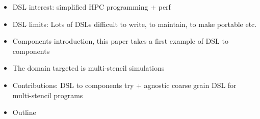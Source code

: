 \begin{itemize}
\item DSL interest: simplified HPC programming + perf
\item DSL limits: Lots of DSLs difficult to write, to maintain, to make portable etc.
\item Components introduction, this paper takes a first example of DSL to components
\item The domain targeted is multi-stencil simulations
\item Contributions: DSL to components try + agnostic coarse grain DSL for multi-stencil programs
\item Outline
\end{itemize}